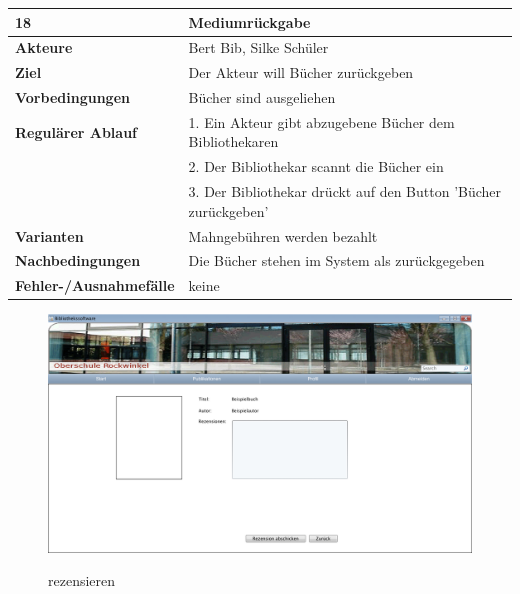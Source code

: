 \documentclass[fontsize=12pt,paper=a4,twoside]{scrartcl}
\begin{document}
\begin{table}[htbp]
\label{18}
\begin{tabular}{|l|p{10cm}|}
\hline 
\textbf{18} & \textbf{Mediumrückgabe} \\ \hline
\textbf{Akteure} & Bert Bib, Silke Schüler\\ \hline
\textbf{Ziel} & Der Akteur will Bücher zurückgeben \\ \hline
\textbf{Vorbedingungen} & Bücher sind ausgeliehen \\ \hline
\textbf{Regulärer Ablauf} & 
1. Ein Akteur gibt abzugebene Bücher dem Bibliothekaren \\
&2. Der Bibliothekar scannt die Bücher ein\\
&3. Der Bibliothekar drückt auf den Button 'Bücher zurückgeben'\\
\hline
\textbf{Varianten} & 
Mahngebühren werden bezahlt \\ \hline
\textbf{Nachbedingungen} & Die Bücher stehen im System als zurückgegeben\\ \hline
\textbf{Fehler-/Ausnahmefälle} & keine\\
\hline
\end{tabular}
\end{table}

\begin{figure}[htbp]
\caption{rezensieren}
\includegraphics[width=1\textwidth]{ScreensWebsite/RezensionEingebenSchueler.png}
  \label{rezensieren}
\end{figure}
\end{document}
